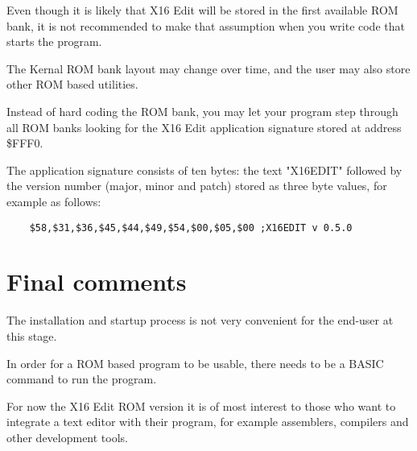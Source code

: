 \documentclass{article}
\begin{document}
    Even though it is likely that X16 Edit will be stored in the first available ROM
    bank, it is not recommended to make that assumption when you write code that starts the program.

    The Kernal ROM bank layout may change over time, and the user may also store other ROM based utilities.

    Instead of hard coding the ROM bank, you may let your program step through all ROM banks looking for the X16 Edit application
    signature stored at address \$FFF0.
    
    The application signature consists of ten bytes: the text "X16EDIT" followed by
    the version number (major, minor and patch) stored as three byte values, for example as follows:

    \begin{verbatim}
    $58,$31,$36,$45,$44,$49,$54,$00,$05,$00 ;X16EDIT v 0.5.0
    \end{verbatim}

\section{Final comments}

    The installation and startup process is not very convenient for the end-user at this stage. 
    
    In order for a ROM based program to be usable, there needs to be a BASIC command to run the program. 
    
    For now the X16 Edit ROM version it is of  most interest to those who want to integrate a text 
    editor with their program, for example assemblers, compilers and other development tools.
\end{document}
